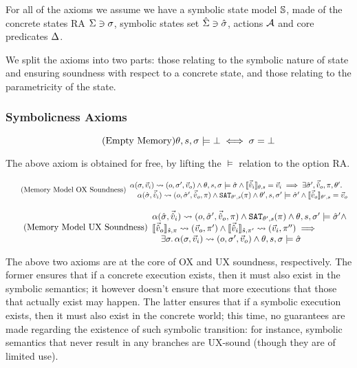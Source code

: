 For all of the axioms we assume we have a symbolic state model $\mmdl$, made of the concrete states RA $\St \ni \st$, symbolic states set $\Sst \ni \sst$, actions $\actions$ and core predicates $\preds$.

We split the axioms into two parts: those relating to the symbolic nature of state and ensuring soundness with respect to a concrete state, and those relating to the parametricity of the state.

\subsubsection{Symbolicness Axioms}

\begin{equation}
\tag{Empty Memory}\label{eq:empty-mem}
\theta,s,\st\models \bot \iff \st = \bot
\end{equation}

The above axiom is obtained for free, by lifting the $\models$ relation to the option RA.

\begin{equation}
\tag{Memory Model OX Soundness}\label{eq:mem-ox-soundness}
\begin{array}{l}
\ppexecc{\alpha}{\st,\ins}{o,\st',\outs} \land \theta,s,\st\models\sst \land \expeval{\sins}=\ins \implies \exists \sst',\souts,\pc,\theta'\ldotp\\
\quad \ppexec{\alpha}{\sst,\sins}{o,\sst',\souts,\pc} \land \SAT[\theta',s](\pc) \land \theta',s,\st'\models \sst' \land  \expeval[\theta',s]{\souts}=\outs
\end{array}
\end{equation}

\begin{equation}
\tag{Memory Model UX Soundness}\label{eq:mem-ux-soundness}
\begin{array}{l}
\ppexec{\alpha}{\sst,\sins}{o,\sst',\souts,\pc} \land \SAT[\theta',s](\pc) \land \theta,s,\st'\models\sst' \land \\
\expeval[\sym s,\pc]{\souts}\rightsquigarrow(\outs,\pc')\land \expeval[\sym s,\pc']{\sins}\rightsquigarrow(\ins,\pc'')\implies\\
\quad \exists \st\ldotp \ppexecc{\alpha}{\st,\ins}{o,\st',\outs} \land \theta,s,\st\models\sst
\end{array}
\end{equation}

The above two axioms are at the core of OX and UX soundness, respectively. The former ensures that if a concrete execution exists, then it must also exist in the symbolic semantics; it however doesn't ensure that more executions that those that actually exist may happen. The latter ensures that if a symbolic execution exists, then it must also exist in the concrete world; this time, no guarantees are made regarding the existence of such symbolic transition: for instance, symbolic semantics that never result in any branches are UX-sound (though they are of limited use).

